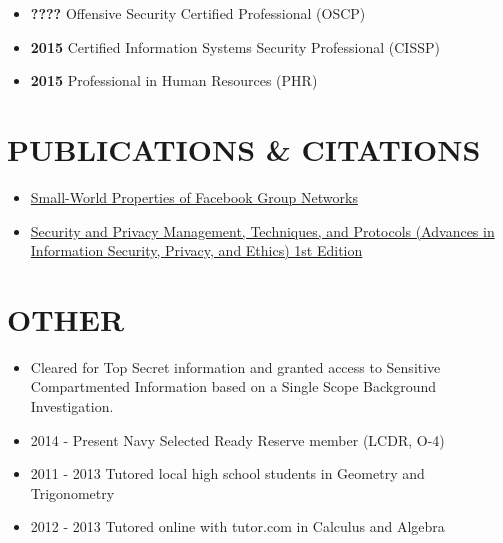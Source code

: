\documentclass[10pt]{article}
\def\tightlist{}
\begin{document}
\begin{itemize}
\tightlist
\item
  \textbf{????} Offensive Security Certified Professional (OSCP)
\item
  \textbf{2015} Certified Information Systems Security Professional
  (CISSP)
\item
  \textbf{2015} Professional in Human Resources (PHR)
\end{itemize}

\hypertarget{publications-citations}{\section{PUBLICATIONS \&
CITATIONS}\label{publications-citations}}

\begin{itemize}
\tightlist
\item
  \href{http://wpmedia.wolfram.com/uploads/sites/13/2018/02/23-3-1.pdf}{Small-World
  Properties of Facebook Group Networks}
\item
  \href{https://smile.amazon.com/gp/product/1522555838/ref=ppx_yo_dt_b_asin_title_o02_s00?ie=UTF8\&psc=1}{Security
  and Privacy Management, Techniques, and Protocols (Advances in
  Information Security, Privacy, and Ethics) 1st Edition}
\end{itemize}

\section{OTHER}\label{other}

\begin{itemize}
\tightlist
\item
  Cleared for Top Secret information and granted access to Sensitive
  Compartmented Information based on a Single Scope Background
  Investigation.
\item
  2014 - Present Navy Selected Ready Reserve member (LCDR, O-4)
\item
  2011 - 2013 Tutored local high school students in Geometry and
  Trigonometry
\item
  2012 - 2013 Tutored online with tutor.com in Calculus and Algebra
\end{itemize}

\end{document}
